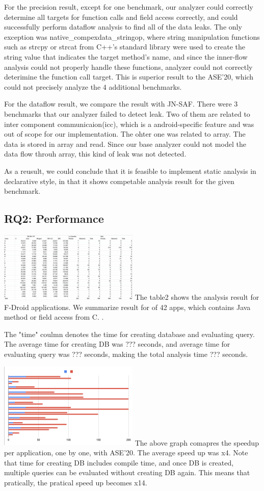 For the precision result, except for one benchmark, our analyzer could
correctly determine all targets for function calls and field access correctly,
and could successfully perform dataflow analysis to find all of the data leaks.
The only exception was native\_compexdata\_stringop, where string manipulation
functions such as strcpy or strcat from C++'s standard library were used to
create the string value that indicates the target method's name, and since the
inner-flow analysis could not properly handle these functions, analyzer could
not correctly deterimine the function call target. This is superior result to
the ASE'20, which could not precisely analyze the 4 additional benchmarks.

For the dataflow result, we compare the result with JN-SAF. There were 3 benchmarks
that our analyzer failed to detect leak. Two of them are related to inter component
communicaion(icc), which is a android-specific feature and was out of scope for
our implementation. The ohter one was related to array. The data is stored in
array and read. Since our base analyzer could not model the data flow throuh
array, this kind of leak was not detected.

As a reusult, we could conclude that it is feasible to implement
static analysis in declarative style, in that it shows competable
analysis result for the given benchmark.


\subsection{RQ2: Performance}
\includegraphics[width=0.5\textwidth]{img/table2}
The table2 shows the analysis result for F-Droid applications. We summarize
result for  of 42 apps, which contains Java method or field access
from C. .

The "time" coulmn denotes the time for creating database and evaluating query.
The average time for creating DB was ??? seconds, and average time for
evaluating query was ???  seconds, making the total analysis time ??? seconds.


\includegraphics[width=0.5\textwidth]{img/graph}
The above graph comapres the speedup per application, one by one, with ASE'20.
The average speed up was x4. Note that time for creating DB includes compile
time, and once DB is created, multiple queries can be evaluated without
creating DB again. This means that pratically, the pratical speed up becomes
x14.

